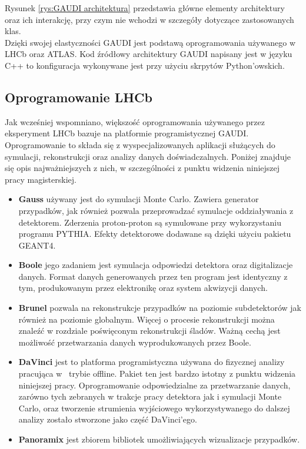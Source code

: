 Rysunek \ref{rys:GAUDI architektura} przedstawia główne elementy architektury oraz ich interakcję, przy czym nie wchodzi w szczegóły dotyczące zastosowanych klas. \\
Dzięki swojej elastyczności GAUDI jest podstawą oprogramowania używanego w LHCb oraz ATLAS.
Kod źródłowy architektury GAUDI napisany jest w języku C++ to konfiguracja wykonywane jest przy użyciu skrpytów Python'owskich.

\subsection{Oprogramowanie LHCb}
Jak wcześniej wspomniano, większość oprogramowania używanego przez eksperyment LHCb bazuje na platformie programistycznej GAUDI. Oprogramowanie to składa się z wyspecjalizowanych aplikacji służących do symulacji, rekonstrukcji oraz analizy danych doświadczalnych. Poniżej znajduje się opis najważniejszych z nich, w szczególności z punktu widzenia niniejszej pracy magisterskiej.
\begin{itemize}
\item \textbf{Gauss} używany jest do symulacji Monte Carlo. Zawiera generator przypadków, jak również pozwala przeprowadzać symulacje oddziaływania z detektorem. Zderzenia proton-proton są symulowane przy wykorzystaniu programu PYTHIA\citep{PYTHIA}. Efekty detektorowe dodawane są dzięki użyciu pakietu GEANT4. 
\item \textbf{Boole} jego zadaniem jest symulacja odpowiedzi detektora oraz digitalizacje danych. Format danych generowanych przez ten program jest identyczny z tym, produkowanym przez elektronikę oraz system akwizycji danych. 
\item \textbf{Brunel} pozwala na rekonstrukcje przypadków na poziomie subdetektorów jak również na poziomie globalnym. Więcej o procesie rekonstrukcji można znaleźć w rozdziale poświęconym rekonstrukcji śladów. Ważną cechą jest możliwość przetwarzania danych wyprodukowanych przez Boole.
\item \textbf{DaVinci} jest to platforma programistyczna używana do fizycznej analizy pracująca w~ trybie offline. Pakiet ten jest bardzo istotny z punktu widzenia niniejszej pracy. Oprogramowanie odpowiedzialne za przetwarzanie danych, zarówno tych zebranych w trakcje pracy detektora jak i symulacji Monte Carlo, oraz tworzenie strumienia wyjściowego wykorzystywanego do dalszej analizy zostało stworzone jako część DaVinci'ego.
\item \textbf{Panoramix} jest zbiorem bibliotek umożliwiających wizualizacje przypadków.    
\end{itemize}
